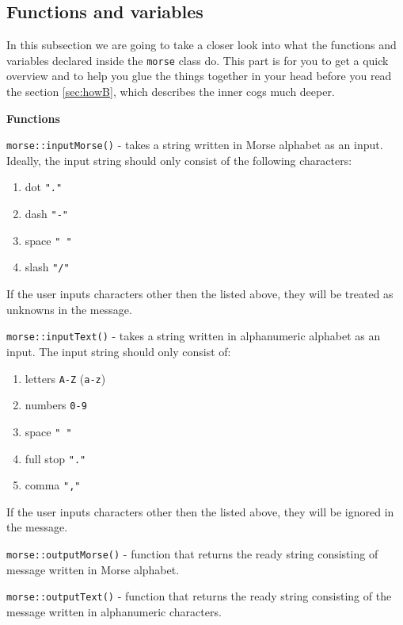 \documentclass[12pt]{report}
\begin{document}
\subsection{Functions and variables}

In this subsection we are going to take a closer look into what the functions and variables declared inside the \verb|morse| class do. This part is for you to get a quick overview and to help you glue the things together in your head before you read the section \ref{sec:howB}, which describes the inner cogs much deeper.

\textbf{Functions}

\verb|morse::inputMorse()| - takes a string written in Morse alphabet as an input. Ideally, the input string should only consist of the following characters:

\begin{enumerate}
\item dot \verb|"."|

\item dash \verb|"-"|

\item space \verb|" "|

\item slash \verb|"/"|
\end{enumerate}

If the user inputs characters other then the listed above, they will be treated as unknowns in the message.

\verb|morse::inputText()| - takes a string written in alphanumeric alphabet as an input. The input string should only consist of:

\begin{enumerate}
\item letters \verb|A-Z| (\verb|a-z|)
\item numbers \verb|0-9|
\item space \verb|" "|
\item full stop \verb|"."|
\item comma \verb|","|
\end{enumerate}

If the user inputs characters other then the listed above, they will be ignored in the message.

\verb|morse::outputMorse()| - function that returns the ready string consisting of message written in Morse alphabet.

\verb|morse::outputText()| - function that returns the ready string consisting of the message written in alphanumeric characters.
\end{document}
